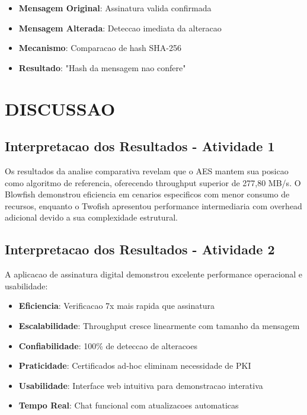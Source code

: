 \documentclass[12pt,a4paper,oneside]{article}
\begin{document}
\begin{itemize}
    \item \textbf{Mensagem Original}: Assinatura valida confirmada
    \item \textbf{Mensagem Alterada}: Deteccao imediata da alteracao
    \item \textbf{Mecanismo}: Comparacao de hash SHA-256
    \item \textbf{Resultado}: "Hash da mensagem nao confere"
\end{itemize}

\section{DISCUSSAO}

\subsection{Interpretacao dos Resultados - Atividade 1}

Os resultados da analise comparativa revelam que o AES mantem sua posicao como algoritmo de referencia, oferecendo throughput superior de 277,80 MB/s. O Blowfish demonstrou eficiencia em cenarios especificos com menor consumo de recursos, enquanto o Twofish apresentou performance intermediaria com overhead adicional devido a sua complexidade estrutural.

\subsection{Interpretacao dos Resultados - Atividade 2}

A aplicacao de assinatura digital demonstrou excelente performance operacional e usabilidade:

\begin{itemize}
    \item \textbf{Eficiencia}: Verificacao 7x mais rapida que assinatura
    \item \textbf{Escalabilidade}: Throughput cresce linearmente com tamanho da mensagem
    \item \textbf{Confiabilidade}: 100\% de deteccao de alteracoes
    \item \textbf{Praticidade}: Certificados ad-hoc eliminam necessidade de PKI
    \item \textbf{Usabilidade}: Interface web intuitiva para demonstracao interativa
    \item \textbf{Tempo Real}: Chat funcional com atualizacoes automaticas
\end{itemize}
\end{document}
